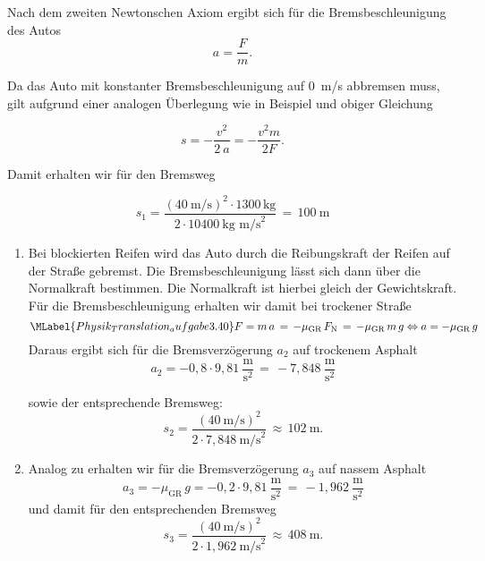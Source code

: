 \begin{MExercises}
\begin{MExercise}
               
               \begin{MSolution}
               Nach dem zweiten Newtonschen Axiom ergibt sich f\"ur die Bremsbeschleunigung des Autos
               $$
               a=\frac{F}{m}.
               $$
               
               Da das Auto mit konstanter Bremsbeschleunigung auf $0$~m/s abbremsen muss, gilt aufgrund einer analogen \"Uberlegung wie in Beispiel  und obiger Gleichung
               
               $$
               s = -\frac{v^{2}}{2~a}=-\frac{v^2m}{2F}.
               $$
               
               Damit erhalten wir f\"ur den Bremsweg 
               
               $$
               s_{1} = \frac{\left(40~\text{m/s}\right)^{2}\cdot 1300\,\text{kg} }{2\cdot 10400~\text{kg~m/s}^{2}} \,=\, 100~\text{m}
               $$
               \begin{enumerate}
               
               \item Bei blockierten Reifen wird das Auto durch die Reibungskraft der Reifen auf der Stra{\ss}e gebremst. Die Bremsbeschleunigung l\"asst sich dann \"uber die Normalkraft bestimmen. Die Normalkraft ist hierbei gleich der Gewichtskraft.
               F\"ur die Bremsbeschleunigung erhalten wir damit bei trockener Stra{\ss}e
               \begin{equation}\MLabel{Physik_Translation_aufgabe3.40}
               F = m\,a \,=\, -\mu_{\text{GR}}\,F_{\text{N}} \,=\, -\mu_{\text{GR}}\,m\,g
               \Leftrightarrow a = -\mu_{\text{GR}}\,g
               \end{equation}
               Daraus ergibt sich f\"ur die Bremsverz\"ogerung $a_{2}$ auf trockenem Asphalt 
               $$
               a_{2} = -{0,8}\cdot {9,81}~\frac{\text{m}}{\text{s}^{2}} \,=\, -{7,848}~\frac{\text{m}}{\text{s}^{2}}
               $$
               
               sowie der entsprechende Bremsweg:
               $$
               s_{2} = \frac{\left(40~\text{m/s}\right)^{2}}{2\cdot {7,848}~\text{m/s}^{2}} \,\approx\, 102~\text{m.}
               $$
               \item Analog zu  erhalten wir f\"ur die Bremsverz\"ogerung $a_{3}$ auf nassem Asphalt
               $$
               a_{3} =-\mu_{\text{GR}}\,g= -{0,2}\cdot {9,81}~\frac{\text{m}}{\text{s}^{2}} \,=\, -{1,962}~\frac{\text{m}}{\text{s}^{2}}
               $$ und damit f\"ur den entsprechenden Bremsweg 
               $$
               s_{3} = \frac{\left(40~\text{m/s}\right)^{2}}{2\cdot {1,962}~\text{m/s}^{2}} \,\approx\, 408~\text{m.}
               $$
               \end{enumerate}
               \end{MSolution}
               \end{MExercise}
               \end{MExercises}

\MPrintIndex


